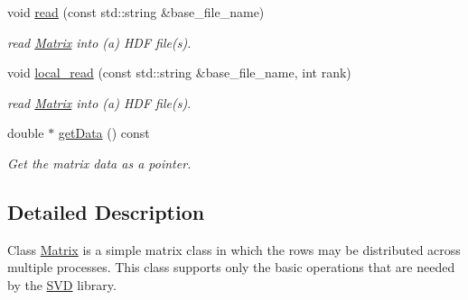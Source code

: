 \begin{DoxyCompactItemize}
void \hyperlink{class_c_a_r_o_m_1_1_matrix_acdc4a8fd238f64d8106b8f1ba8f2384e}{read} (const std\-::string \&base\-\_\-file\-\_\-name)
\begin{DoxyCompactList}\small\item\em read \hyperlink{class_c_a_r_o_m_1_1_matrix}{Matrix} into (a) H\-D\-F file(s). \end{DoxyCompactList}\item 
void \hyperlink{class_c_a_r_o_m_1_1_matrix_a09da21ed0f70b190d5625303ea2d92e4}{local\-\_\-read} (const std\-::string \&base\-\_\-file\-\_\-name, int rank)
\begin{DoxyCompactList}\small\item\em read \hyperlink{class_c_a_r_o_m_1_1_matrix}{Matrix} into (a) H\-D\-F file(s). \end{DoxyCompactList}\item 
\hypertarget{class_c_a_r_o_m_1_1_matrix_a951b1d63fafbc9b4ddd112bd400ca758}{double $\ast$ \hyperlink{class_c_a_r_o_m_1_1_matrix_a951b1d63fafbc9b4ddd112bd400ca758}{get\-Data} () const }\label{class_c_a_r_o_m_1_1_matrix_a951b1d63fafbc9b4ddd112bd400ca758}

\begin{DoxyCompactList}\small\item\em Get the matrix data as a pointer. \end{DoxyCompactList}\end{DoxyCompactItemize}


\subsection{Detailed Description}
Class \hyperlink{class_c_a_r_o_m_1_1_matrix}{Matrix} is a simple matrix class in which the rows may be distributed across multiple processes. This class supports only the basic operations that are needed by the \hyperlink{class_c_a_r_o_m_1_1_s_v_d}{S\-V\-D} library. 

